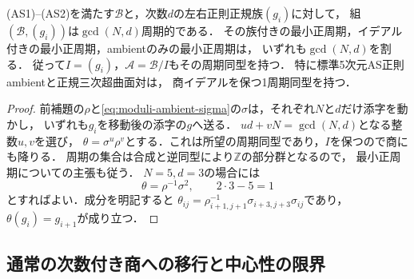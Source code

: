 \begin{theorem}[正規超曲面対の最大公約数周期性]
\label{thm:pair-route-gcd}
\label{thm:moduli-ambient-gcd}
\textup{(AS1)--(AS2)}を満たす$\mathcal B$と，次数$d$の左右正則正規族$(g_i)$に対して，
組$(\mathcal B,(g_i))$は$\gcd(N,d)$周期的である．
その族付きの最小正周期，イデアル付きの最小正周期，ambientのみの最小正周期は，
いずれも$\gcd(N,d)$を割る．
従って$I=(g_i)$，$\mathcal A=\mathcal B/I$もその周期同型を持つ．
特に標準5次元AS正則ambientと正規三次超曲面対は，
商イデアルを保つ1周期同型を持つ．
\end{theorem}
\begin{proof}
前補題の$\rho$と\eqref{eq:moduli-ambient-sigma}の$\sigma$は，それぞれ$N$と$d$だけ添字を動かし，
いずれも$g_i$を移動後の添字の$g$へ送る．
$ud+vN=\gcd(N,d)$となる整数$u,v$を選び，
$\theta=\sigma^u\rho^v$とする．これは所望の周期同型であり，$I$を保つので商にも降りる．
周期の集合は合成と逆同型により$\mathbb Z$の部分群となるので，
最小正周期についての主張も従う．
$N=5,d=3$の場合には
\begin{equation}\label{eq:pair-route-one-period}
 \theta=\rho^{-1}\sigma^2,\qquad 2\cdot3-5=1
\end{equation}
とすればよい．成分を明記すると
$\theta_{ij}=\rho^{-1}_{i+1,j+1}\sigma_{i+3,j+3}\sigma_{ij}$であり，
$\theta(g_i)=g_{i+1}$が成り立つ．
\end{proof}

\subsection{通常の次数付き商への移行と中心性の限界}

